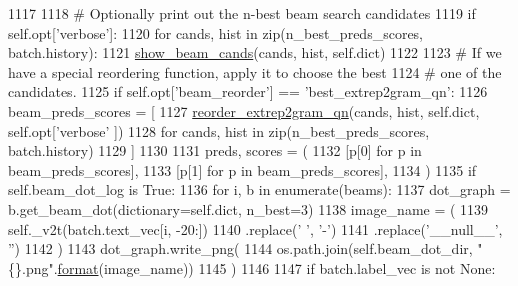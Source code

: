 \begin{DoxyCode}
1117 
1118             \textcolor{comment}{# Optionally print out the n-best beam search candidates}
1119             \textcolor{keywordflow}{if} self.opt[\textcolor{stringliteral}{'verbose'}]:
1120                 \textcolor{keywordflow}{for} cands, hist \textcolor{keywordflow}{in} zip(n\_best\_preds\_scores, batch.history):
1121                     \hyperlink{namespaceprojects_1_1controllable__dialogue_1_1controllable__seq2seq_1_1util_ad8bee76107b49379c621746db6fd7d4e}{show\_beam\_cands}(cands, hist, self.dict)
1122 
1123             \textcolor{comment}{# If we have a special reordering function, apply it to choose the best}
1124             \textcolor{comment}{# one of the candidates.}
1125             \textcolor{keywordflow}{if} self.opt[\textcolor{stringliteral}{'beam\_reorder'}] == \textcolor{stringliteral}{'best\_extrep2gram\_qn'}:
1126                 beam\_preds\_scores = [
1127                     \hyperlink{namespaceprojects_1_1controllable__dialogue_1_1controllable__seq2seq_1_1util_aa1ba917d170af0191d23b033358bc9eb}{reorder\_extrep2gram\_qn}(cands, hist, self.dict, self.opt[\textcolor{stringliteral}{'verbose'}
      ])
1128                     \textcolor{keywordflow}{for} cands, hist \textcolor{keywordflow}{in} zip(n\_best\_preds\_scores, batch.history)
1129                 ]
1130 
1131             preds, scores = (
1132                 [p[0] \textcolor{keywordflow}{for} p \textcolor{keywordflow}{in} beam\_preds\_scores],
1133                 [p[1] \textcolor{keywordflow}{for} p \textcolor{keywordflow}{in} beam\_preds\_scores],
1134             )
1135             \textcolor{keywordflow}{if} self.beam\_dot\_log \textcolor{keywordflow}{is} \textcolor{keyword}{True}:
1136                 \textcolor{keywordflow}{for} i, b \textcolor{keywordflow}{in} enumerate(beams):
1137                     dot\_graph = b.get\_beam\_dot(dictionary=self.dict, n\_best=3)
1138                     image\_name = (
1139                         self.\_v2t(batch.text\_vec[i, -20:])
1140                         .replace(\textcolor{stringliteral}{' '}, \textcolor{stringliteral}{'-'})
1141                         .replace(\textcolor{stringliteral}{'\_\_null\_\_'}, \textcolor{stringliteral}{''})
1142                     )
1143                     dot\_graph.write\_png(
1144                         os.path.join(self.beam\_dot\_dir, \textcolor{stringliteral}{"\{\}.png"}.\hyperlink{namespaceparlai_1_1chat__service_1_1services_1_1messenger_1_1shared__utils_a32e2e2022b824fbaf80c747160b52a76}{format}(image\_name))
1145                     )
1146 
1147         \textcolor{keywordflow}{if} batch.label\_vec \textcolor{keywordflow}{is} \textcolor{keywordflow}{not} \textcolor{keywordtype}{None}:

\end{DoxyCode}
